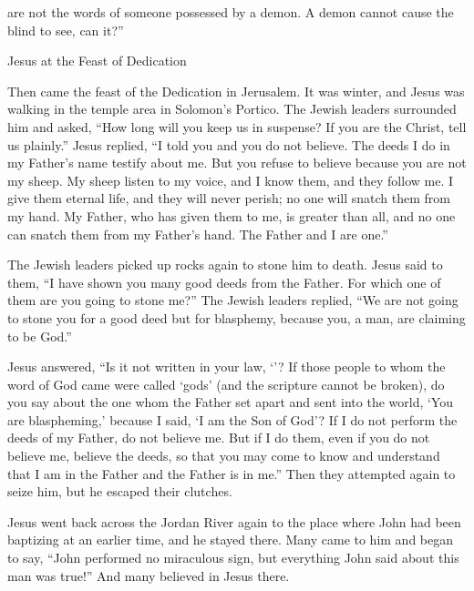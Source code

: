 {are
not
the words
of someone possessed by a demon.
A demon
cannot
cause
the blind
to see, can it?”
\par }{\SH Jesus at the Feast of Dedication
\par }{\PP {}Then
came
the feast of the Dedication
in
Jerusalem.
It was winter, and
Jesus
was walking
in
the temple area
in
Solomon’s
Portico.
The Jewish leaders
surrounded
him
and
asked, “How long
will you keep
us
in suspense? If
you
are
the Christ,
tell
us
plainly.”
Jesus
replied, “I told
you
and
you do
not
believe.
The deeds
I
do
in
my
Father’s
name
testify
about
me.
But
you
refuse
to believe
because
you are
not
my
sheep.
My
sheep
listen
to my
voice,
and I
know
them,
and
they follow
me.
I
give
them
eternal
life,
and
they will
never
perish;
no
one
will snatch
them
from
my
hand.
My
Father,
who has given
them to me,
is
greater than
all,
and
no one
can
snatch
them from
my Father’s
hand.
The Father
and
I
are
one.”
\par }{\PP {}The Jewish leaders
picked up
rocks
again
to stone
him to death.
Jesus
said
to them, “I have shown
you
many
good
deeds
from
the Father.
For
which one
of them
are you going to stone
me?”
The Jewish leaders
replied, “We are
not
going to stone
you
for
a
good
deed
but
for
blasphemy,
because
you,
a man,
are
claiming
to be God.”
\par }{\PP {}Jesus
answered, “Is it
not
written
in
your
law, ‘{}’?
If
those
people to
whom
the word
of God
came
were called
‘gods’
(and
the scripture
cannot
be broken),
do you say
about the one whom
the Father
set apart
and
sent
into
the world,
‘You
are blaspheming,’
because
I said,
‘I am
the Son
of God’?
If
I do
not
perform
the deeds
of
my
Father,
do
not
believe
me.
But
if
I do
them, even if
you do
not
believe
me,
believe
the deeds,
so that
you may come to know
and
understand
that
I
am in
the Father
and the Father
is in
me.”
Then
they attempted
again
to seize
him,
but
he escaped
their
clutches.
\par }{\PP {}Jesus went
back
across
the Jordan River
again to
the place
where
John
had been baptizing
at an earlier time,
and
he stayed
there.
Many
came
to
him
and
began to say,
“John
performed
no
miraculous sign,
but
everything
John
said
about
this man
was
true!”
And
many
believed
in
Jesus
there.

}
